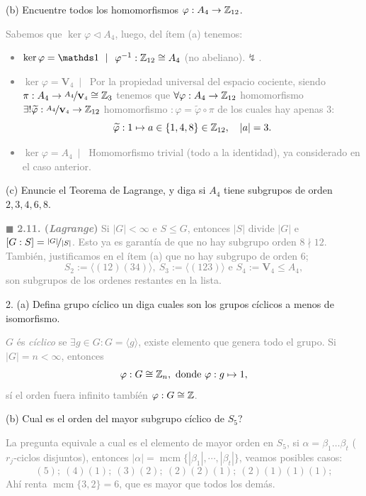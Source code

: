 (b) Encuentre todos los homomorfismos \(\varphi : A_4 \to \mathbb{Z}_{12}\). 

\textcolor{gray}{
  Sabemos que \(\ker \varphi \lhd A_4\), luego, del ítem (a) tenemos: 
  \begin{itemize}[left = 0cm]
    \item \(\ker \varphi = \id \ \mid \ \) \(\varphi^{-1}: \mathbb{Z}_{12}\cong A_4\) (no abeliano).\(\lightning\).
    \item \(\ker \varphi = \textbf{V}_4 \ \mid\  \) Por la propiedad universal del espacio cociente, siendo \(\pi : A_4 \to \nicefrac{A_4}{\textbf{V}_4} \cong \mathbb{Z}_3\) tenemos que \(\forall \varphi : A_4 \to \mathbb{Z}_{12}\)  homomorfismo \(\exists ! \widetilde{\varphi} : \nicefrac{A_4}{\textbf{V}_4} \to \mathbb{Z}_{12}\) homomorfismo \(: \varphi = \widetilde{\varphi} \circ \pi\) de los cuales hay apenas \(3\): 
    \[\widetilde{\varphi} : 1 \mapsto a \in \{1 , 4, 8\} \in \mathbb{Z}_{12},\ \ \ |a | = 3.\]
    \item \vspace{-0.2cm}\(\ker\varphi = A_4 \  \mid\ \) Homomorfismo trivial (todo a la identidad), ya considerado en el caso anterior. 
  \end{itemize} 
}

(c) Enuncie el Teorema de Lagrange, y diga  si \(A_4\) tiene subgrupos de orden \(2,3,4,6,8\). 

\textcolor{gray}{
  \(\blacksquare\) \textbf{2.11. (\emph{Lagrange})} Si \(|G| < \infty\) e \( S \leq G \), entonces \(|S|\) divide \(|G|\) e \([G:S] = \nicefrac{|G|}{|S|}\). Esto ya es garantía de que no hay subgrupo orden \(8\nmid 12\). También, justificamos en el ítem (a)  que no hay subgrupo de orden \(6\); 
    \[S_2 := \langle (12)(34)\rangle, \ S_3:= \langle (123)\rangle \text{ e } S_4:= \textbf{V}_4 \leq A_4,\] 
  son subgrupos de los ordenes restantes en la lista. 
}

2. (a) Defina grupo cíclico un diga cuales son los grupos cíclicos a menos de isomorfismo. 

\textcolor{gray}{
  \(G\) és \emph{cíclico} se \(\exists g \in G : G = \langle g \rangle\), existe elemento que genera todo el grupo. Si \(|G| = n < \infty\), entonces 
  \[\varphi : G \cong \mathbb{Z}_n, \text{ donde }\varphi : g \mapsto 1, \]  
  sí el orden fuera infinito tambíén \(\varphi: G \cong \mathbb{Z}\). 
}

(b) Cual es el orden del mayor subgrupo cíclico de \(S_5\)?

\textcolor{gray}{
  La pregunta equivale a cual es el elemento de mayor orden en \(S_5\), si \(\alpha = \beta_1 \ldots \beta_t\) (\(r_j\)-ciclos disjuntos), entonces \(|\alpha| = \operatorname{mcm}\{|\beta_1|, \cdots, |\beta_t|\}\), veamos posibles casos:   
  \[(5); \ (4)(1);\ (3)(2); \ (2)(2)(1); \ (2)(1)(1)(1); \]
  Ahí renta \(\operatorname{mcm}\{3,2\} = 6\), que es mayor que todos los demás. 
}

